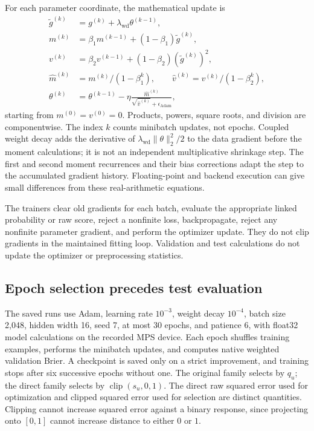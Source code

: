 \documentclass[11pt,a4paper]{article}
\begin{document}
For each parameter coordinate, the mathematical update is
\begin{align}
\widetilde g^{(k)}&=g^{(k)}+\lambda_{\mathrm{wd}}\theta^{(k-1)},\\
m^{(k)}&=\beta_1m^{(k-1)}+(1-\beta_1)\widetilde g^{(k)},\\
v^{(k)}&=\beta_2v^{(k-1)}+(1-\beta_2)(\widetilde g^{(k)})^2,\\
\widehat m^{(k)}&=m^{(k)}/(1-\beta_1^k),\qquad
\widehat v^{(k)}=v^{(k)}/(1-\beta_2^k),\\
\theta^{(k)}&=\theta^{(k-1)}-
\eta\frac{\widehat m^{(k)}}{\sqrt{\widehat v^{(k)}}+\epsilon_{\mathrm{Adam}}},
\end{align}
starting from $m^{(0)}=v^{(0)}=0$. Products, powers, square roots, and division
are componentwise. The index $k$ counts minibatch updates, not epochs.
Coupled weight decay adds the derivative of
$\lambda_{\mathrm{wd}}\|\theta\|_2^2/2$ to the data gradient before the
moment calculations; it is not an independent multiplicative shrinkage step.
The first and second moment recurrences and their bias corrections adapt the
step to the accumulated gradient history. Floating-point and backend execution
can give small differences from these real-arithmetic equations.

The trainers clear old gradients for each batch, evaluate the appropriate
linked probability or raw score, reject a nonfinite loss, backpropagate,
reject any nonfinite parameter gradient, and perform the optimizer update.
They do not clip gradients in the maintained fitting loop. Validation and
test calculations do not update the optimizer or preprocessing statistics.


\subsection{Epoch selection precedes test evaluation}

The saved runs use Adam, learning rate $10^{-3}$, weight decay $10^{-4}$,
batch size 2,048, hidden width 16, seed 7, at most 30 epochs, and patience 6,
with float32 model calculations on the recorded MPS device. Each epoch
shuffles training examples, performs the minibatch updates, and computes
native weighted validation Brier. A checkpoint is saved only on a strict
improvement, and training stops after six successive epochs without one.
The original family selects by $q_u$; the direct family selects by
$\operatorname{clip}(s_u,0,1)$. The direct raw squared error used for
optimization and clipped squared error used for selection are distinct
quantities. Clipping cannot increase squared error against a binary response,
since projecting onto $[0,1]$ cannot increase distance to either $0$ or $1$.
\end{document}
